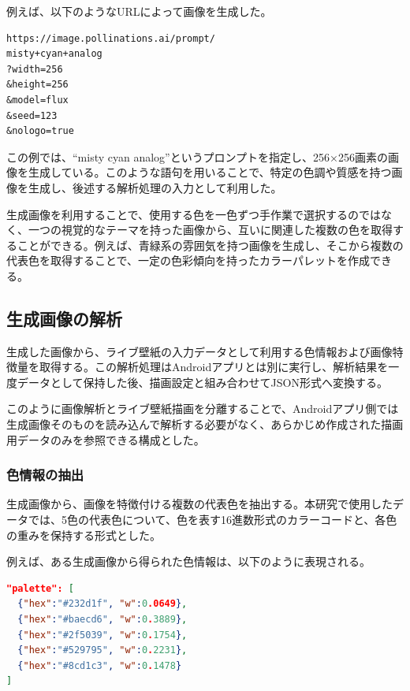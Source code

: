 例えば、以下のようなURLによって画像を生成した。

\noindent\begin{minipage}{\linewidth}
\begin{lstlisting}[language={},caption={元画像生成用URLの例},label={lst:image-generation-url}]
https://image.pollinations.ai/prompt/
misty+cyan+analog
?width=256
&height=256
&model=flux
&seed=123
&nologo=true
\end{lstlisting}
\end{minipage}\par

この例では、``misty cyan analog''というプロンプトを指定し、256×256画素の画像を生成している。このような語句を用いることで、特定の色調や質感を持つ画像を生成し、後述する解析処理の入力として利用した。

生成画像を利用することで、使用する色を一色ずつ手作業で選択するのではなく、一つの視覚的なテーマを持った画像から、互いに関連した複数の色を取得することができる。例えば、青緑系の雰囲気を持つ画像を生成し、そこから複数の代表色を取得することで、一定の色彩傾向を持ったカラーパレットを作成できる。


\subsection{生成画像の解析}

生成した画像から、ライブ壁紙の入力データとして利用する色情報および画像特徴量を取得する。この解析処理はAndroidアプリとは別に実行し、解析結果を一度データとして保持した後、描画設定と組み合わせてJSON形式へ変換する。

このように画像解析とライブ壁紙描画を分離することで、Androidアプリ側では生成画像そのものを読み込んで解析する必要がなく、あらかじめ作成された描画用データのみを参照できる構成とした。


\subsubsection{色情報の抽出}

生成画像から、画像を特徴付ける複数の代表色を抽出する。本研究で使用したデータでは、5色の代表色について、色を表す16進数形式のカラーコードと、各色の重みを保持する形式とした。

例えば、ある生成画像から得られた色情報は、以下のように表現される。

\noindent\begin{minipage}{\linewidth}
\begin{lstlisting}[language=JSON,caption={抽出したカラーパレットの例},label={lst:extracted-palette}]
"palette": [
  {"hex":"#232d1f", "w":0.0649},
  {"hex":"#baecd6", "w":0.3889},
  {"hex":"#2f5039", "w":0.1754},
  {"hex":"#529795", "w":0.2231},
  {"hex":"#8cd1c3", "w":0.1478}
]
\end{lstlisting}
\end{minipage}\par

